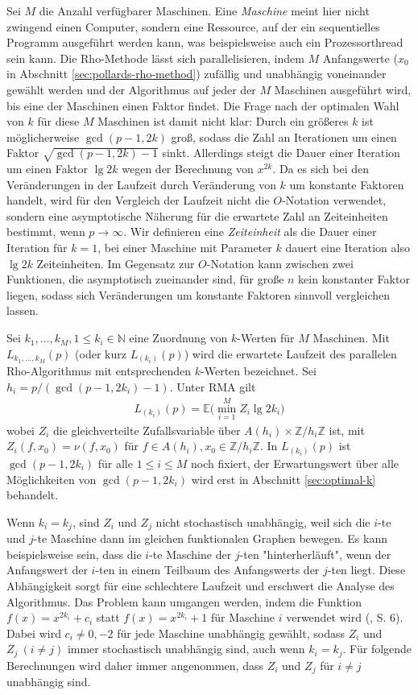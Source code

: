 \documentclass[a4paper, 11pt, ngerman]{article}
\newcommand{\E}{\mathbb{E}}
\newcommand{\N}{\mathbb{N}}
\newcommand{\Z}{\mathbb{Z}}
\theoremstyle{definition}
\theoremstyle{plain}
\theoremstyle{remark}
\begin{document}
Sei $M$ die Anzahl verfügbarer Maschinen. Eine \emph{Maschine} meint hier nicht zwingend einen Computer, sondern eine Ressource, auf der ein sequentielles Programm ausgeführt werden kann, was beispielsweise auch ein Prozessorthread sein kann. Die Rho-Methode lässt sich parallelisieren, indem $M$ Anfangswerte ($x_0$ in Abschnitt \ref{sec:pollards-rho-method}) zufällig und unabhängig voneinander gewählt werden und der Algorithmus auf jeder der $M$ Maschinen ausgeführt wird, bis eine der Maschinen einen Faktor findet. Die Frage nach der optimalen Wahl von $k$ für diese $M$ Maschinen ist damit nicht klar: Durch ein größeres $k$ ist möglicherweise $\gcd(p - 1, 2k)$ groß, sodass die Zahl an Iterationen um einen Faktor $\sqrt{\gcd(p - 1, 2k) -1}$ sinkt. Allerdings steigt die Dauer einer Iteration um einen Faktor $\lg 2k$ wegen der Berechnung von $x^{2k}$. Da es sich bei den Veränderungen in der Laufzeit durch Veränderung von $k$ um konstante Faktoren handelt, wird für den Vergleich der Laufzeit nicht die $O$-Notation verwendet, sondern eine asymptotische Näherung für die erwartete Zahl an Zeiteinheiten bestimmt, wenn $p \to \infty$. Wir definieren eine \emph{Zeiteinheit} als die Dauer einer Iteration für $k = 1$, bei einer Maschine mit Parameter $k$ dauert eine Iteration also $\lg 2k$ Zeiteinheiten. Im Gegensatz zur $O$-Notation kann zwischen zwei Funktionen, die asymptotisch zueinander sind, für große $n$ kein konstanter Faktor liegen, sodass sich Veränderungen um konstante Faktoren sinnvoll vergleichen lassen.

Sei $k_1, \dots, k_M, 1 \le k_i \in \N$ eine Zuordnung von $k$-Werten für $M$ Maschinen. Mit $L_{k_1, \dots, k_M}(p)$ (oder kurz $L_{(k_i)}(p)$) wird die erwartete Laufzeit des parallelen Rho-Algorithmus mit entsprechenden $k$-Werten bezeichnet. Sei $h_i = p/(\gcd(p - 1, 2k_i) - 1)$. Unter RMA gilt
\begin{align}
    L_{(k_i)}(p) = \E \bigg ( \min_{i = 1}^M Z_i \lg 2k_i \bigg )
    \label{eq:lki-definition}
\end{align}
wobei $Z_i$ die gleichverteilte Zufallsvariable über $A(h_i) \times \Z/h_i\Z$ ist, mit $Z_i(f, x_0) = \nu(f, x_0)$ für $f \in A(h_i), x_0 \in \Z/h_i\Z$. In $L_{(k_i)}(p)$ ist $\gcd(p - 1, 2k_i)$ für alle $1 \le i \le M$ noch fixiert, der Erwartungswert über alle Möglichkeiten von $\gcd(p - 1, 2k_i)$ wird erst in Abschnitt \ref{sec:optimal-k} behandelt.

Wenn $k_i = k_j$, sind $Z_i$ und $Z_j$ nicht stochastisch unabhängig, weil sich die $i$-te und $j$-te Maschine dann im gleichen funktionalen Graphen bewegen. Es kann beispielsweise sein, dass die $i$-te Maschine der $j$-ten "hinterherläuft", wenn der Anfangswert der $i$-ten in einem Teilbaum des Anfangswerts der $j$-ten liegt. Diese Abhängigkeit sorgt für eine schlechtere Laufzeit und erschwert die Analyse des Algorithmus. Das Problem kann umgangen werden, indem die Funktion $f(x) = x^{2k_i} + c_i$ statt $f(x) = x^{2k_i} + 1$ für Maschine $i$ verwendet wird (\cite{cr99}, S. 6). Dabei wird $c_i \ne 0, -2$ für jede Maschine unabhängig gewählt, sodass $Z_i$ und $Z_j \ (i \ne j)$ immer stochastisch unabhängig sind, auch wenn $k_i = k_j$. Für folgende Berechnungen wird daher immer angenommen, dass $Z_i$ und $Z_j$ für $i \ne j$ unabhängig sind.
\end{document}
